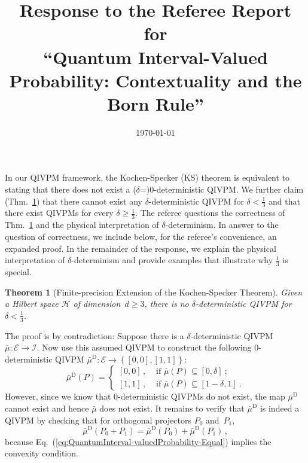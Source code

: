 \documentclass[english,reprint, aps, prl,superscriptaddress, showpacs,
showkeys, longbibliography, amsmath, amssymb, floatfix]{revtex4-1}
\theoremstyle{plain}
\newtheorem{thm}{Theorem}
\theoremstyle{definition}
\newcommand{\Hilb}{\mathcal{H}}
\newcommand{\events}{\ensuremath{\mathcal{E}}}
\newcommand{\imposs}{\ensuremath{\left[0,0\right]}}
\newcommand{\necess}{\ensuremath{\left[1,1\right]}}
\begin{document}
\title{Response to the Referee Report for \texorpdfstring{\\}{}
``Quantum Interval-Valued Probability: Contextuality and the Born Rule''}
\date{\today}

\maketitle


\noindent In our QIVPM framework, the Kochen-Specker (KS) theorem is
equivalent to stating that there does not exist a
($\delta$=)$0$-deterministic QIVPM. We further claim
(Thm.~\ref{cor:Kochen-Specker-IVPM}) that there cannot exist any
$\delta$-deterministic QIVPM for $\delta<\frac{1}{3}$ and that there
exist QIVPMs for every $\delta\ge\frac{1}{3}$.  The referee questions
the correctness of Thm.~\ref{cor:Kochen-Specker-IVPM} and the physical
interpretation of $\delta$-determinism. In answer to the question of
correctness, we include below, for the referee's convenience, an
expanded proof. In the remainder of the response, we explain the
physical interpretation of $\delta$-determinism and provide examples
that illustrate why $\frac{1}{3}$ is special.

\begin{thm}[Finite-precision Extension of the Kochen-Specker Theorem]
\label{cor:Kochen-Specker-IVPM} Given a Hilbert space $\Hilb$ of
dimension~$d\ge3$, there is no $\delta$-deterministic QIVPM for
$\delta<\frac{1}{3}$.\end{thm}

The proof is by contradiction: Suppose there is a $\delta$-deterministic
QIVPM~$\bar{\mu}:\events\rightarrow\mathscr{I}$. Now use this assumed
QIVPM to construct the following $0$-deterministic QIVPM $\bar{\mu}^{\textrm{D}}:\events\rightarrow\left\{ \imposs,\necess\right\} $:
\begin{equation}
\bar{\mu}^{\textrm{D}}\left(P\right)=\begin{cases}
\imposs\,, & \textrm{ if }\bar{\mu}\left(P\right)\subseteq\left[0,\delta\right]\:;\\
\necess\,, & \textrm{ if }\bar{\mu}\left(P\right)\subseteq\left[1-\delta,1\right]\:.
\end{cases}
\end{equation}
However, since we know that $0$-deterministic QIVPMs do not exist,
the map $\bar{\mu}^{\textrm{D}}$ cannot exist and hence $\bar{\mu}$
does not exist. It remains to verify that $\bar{\mu}^{\textrm{D}}$
is indeed a QIVPM by checking that for orthogonal projectors $P_{0}$
and~$P_{1}$, 
\begin{equation}
\bar{\mu}^{\textrm{D}}\left(P_{0}+P_{1}\right)=\bar{\mu}^{\textrm{D}}\left(P_{0}\right)+\bar{\mu}^{\textrm{D}}\left(P_{1}\right)\,,\label{eq:QuantumInterval-valuedProbability-Equal}
\end{equation}
because Eq.~(\ref{eq:QuantumInterval-valuedProbability-Equal}) implies
the convexity condition.
\end{document}
